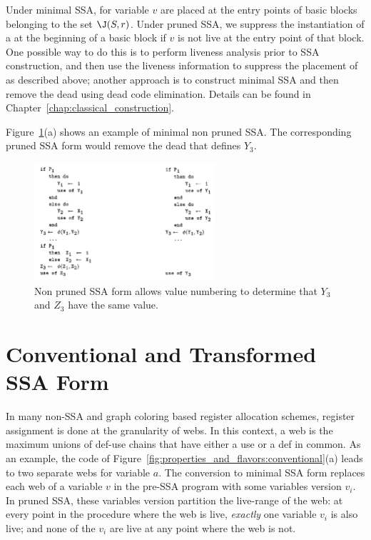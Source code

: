 Under minimal SSA, \phifuns for variable $v$ are placed at
the entry points of basic blocks belonging to the set $\J(S,r)$. 
Under pruned SSA, we suppress the instantiation of a \phifun
at the beginning of a basic block if $v$ is not live
at the entry point of that block. One possible way to do this is to
perform liveness analysis prior to SSA construction, and then
use the liveness information to suppress the placement of \phifuns
as described above; another approach is to construct minimal SSA
and then remove the dead \phifuns using dead code
elimination. Details can be found in Chapter~\ref{chap:classical_construction}.

Figure~\ref{fig:properties_and_flavors:pruned}(a) shows an example of minimal non pruned SSA.
The corresponding pruned SSA form would remove the dead \phifun that defines $Y_3$.

\begin{figure}
\includegraphics[width=0.6\textwidth]{pruned.pdf}
\caption{\label{fig:properties_and_flavors:pruned}Non pruned SSA form allows value numbering to determine that $Y_3$ and $Z_3$ have the same value.}
\end{figure}



\section{Conventional and Transformed SSA Form}
\label{sec-prop-conventional}

In many non-SSA and graph coloring based register allocation schemes, register assignment is done at the granularity of webs. In this context, a web is the maximum unions of def-use chains that have either a use or a def in common. As an example, the code of Figure~\ref{fig:properties_and_flavors:conventional}(a) leads to two separate webs for variable $a$.
The conversion to minimal SSA form replaces each web of a variable $v$ in the pre-SSA
program with some variables version $v_i$. In pruned
SSA, these variables version partition the live-range of the web: at every point in the procedure where the web is
live, \emph{exactly} one variable $v_{i}$ is also live; and none of
the $v_{i}$ are live at any point where the web is not. 



